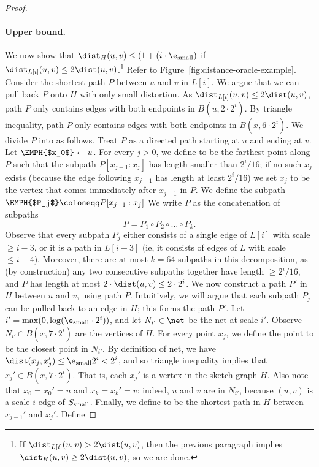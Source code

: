\begin{proof}
    \paragraph{Upper bound.} We now show that $\dist_H(u,v) \le (1+(i \cdot \e_{\rm small})$ if $\dist_{L[i]}(u,v) \le 2 \dist(u,v)$.\footnote{If $\dist_{L[i]}(u,v) > 2 \dist(u,v)$, then the previous paragraph implies $\dist_H(u,v) \ge 2 \dist(u,v)$, so we are
    done.
    }
    Refer to Figure~\ref{fig:distance-oracle-example}. Consider the shortest path $P$ between $u$ and $v$ in $L[i]$. We argue that we can pull back $P$ onto $H$ with only small distortion. As $\dist_{L[i]}(u,v) \le 2 \dist(u,v)$, path $P$ only contains edges with both endpoints in $B(u, 2 \cdot 2^i)$. By triangle inequality, path $P$ only contains edges with both endpoints in $B(x, 6 \cdot 2^i)$. 
We divide $P$ into  as follows. Treat $P$ as a directed path starting at $u$ and ending at $v$. Let $\EMPH{$x_0$} \gets u$. For every $j > 0$, we define  to be the farthest point along $P$ such that the subpath $P[x_{j-1}:x_j]$ has length smaller than $2^i / 16$; if no such $x_j$ exists (because the edge following $x_{j-1}$ has length at least $2^i / 16$) we set $x_j$ to be the vertex that comes immediately after $x_{j-1}$ in $P$.  We define the subpath $\EMPH{$P_j$} \coloneqq P[x_{j-1}:x_j]$
We write $P$ as the concatenation of subpaths
\[P = P_1 \circ P_2 \circ \ldots \circ P_k.\]
Observe that every subpath $P_j$ either consists of a single edge of $L[i]$ with scale $\ge i - 3$, or it is a path in $L[i-3]$ (ie, it consists of edges of $L$ with scale $\le i-4$). Moreover, there are at most $k = 64$ subpaths in this decomposition, as (by construction) any two consecutive subpaths together have length $\ge 2^i / 16$, and $P$ has length at most $2 \cdot \dist(u,v) \le 2 \cdot 2^i$.
%
We now construct a path $P'$ in $H$ between $u$ and $v$, using path $P$. Intuitively, we will argue that each subpath $P_j$ can be pulled back to an edge in $H$; this forms the path $P'$. Let $i' = \max(0, \log(\e_{\rm small}\cdot 2^i))$, and let $N_{i'} \in \net$ be the net at scale $i'$. Observe $N_{i'} \cap B(x, 7\cdot 2^i)$ are the vertices of $H$. For every point $x_j$, we define the point  to be the closest point in $N_{i'}$. By definition of net, we have $\dist(x_j,x_j') \le \e_{\rm small} 2^i < 2^i$, and so triangle inequality implies that $x_j' \in B(x, 7 \cdot 2^i)$. That is, each $x_j'$ is a vertex in the sketch graph $H$. Also note that $x_0 = x_0' = u$ and $x_k = x_k' = v$: indeed, $u$ and $v$ are in $N_{i'}$, because $(u,v)$ is a scale-$i$ edge of $S_{\rm small}$.  Finally, we define  to be the shortest path in $H$ between $x_{j-1}'$ and $x_j'$. Define

\end{proof}
